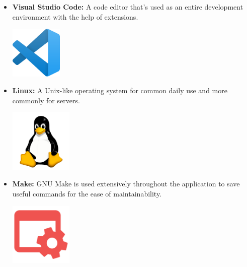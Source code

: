 \begin{itemize}
          \newpage
    \item \textbf{Visual Studio Code:} \newline A code editor that's used as an entire development environment with the help of extensions. \newline
          \begin{minipage}{\linewidth}
              \centering
              \includegraphics[width=2.5cm]{src/assets/logos/vscode_512x512.png}
          \end{minipage}
    \item \textbf{Linux:} \newline A Unix-like operating system for common daily use and more commonly for servers. \newline
          \begin{minipage}{\linewidth}
              \centering
              \includegraphics[width=3cm]{src/assets/logos/linux_512x512.png}
          \end{minipage}
    \item \textbf{Make:} \newline GNU Make is used extensively throughout the application to save useful commands for the ease of maintainability. \newline
          \begin{minipage}{\linewidth}
              \centering
              \includegraphics[width=3cm]{src/assets/logos/makefile_512x512.png}
          \end{minipage}


\end{itemize}

